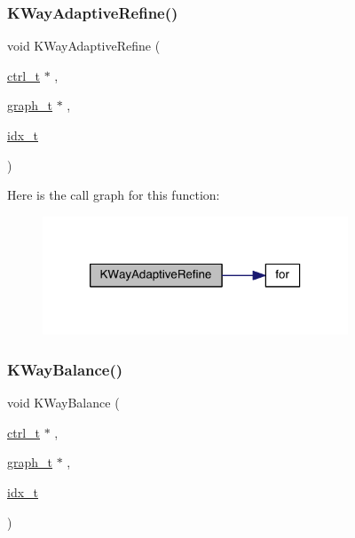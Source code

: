 \subsubsection{\texorpdfstring{K\+Way\+Adaptive\+Refine()}{KWayAdaptiveRefine()}}
{\footnotesize\ttfamily void K\+Way\+Adaptive\+Refine (\begin{DoxyParamCaption}\item[{\hyperlink{a00742}{ctrl\+\_\+t} $\ast$}]{,  }\item[{\hyperlink{a00734}{graph\+\_\+t} $\ast$}]{,  }\item[{\hyperlink{a00876_aaa5262be3e700770163401acb0150f52}{idx\+\_\+t}}]{ }\end{DoxyParamCaption})}

Here is the call graph for this function\+:\nopagebreak
\begin{figure}[H]
\begin{center}
\leavevmode
\includegraphics[width=258pt]{a00951_ad96acf60ec61cb61c4b25fe4d7cb6364_cgraph}
\end{center}
\end{figure}
\mbox{\label{a00951_aa1854c6e5d38950ac52237275f55ca2f}} 
\subsubsection{\texorpdfstring{K\+Way\+Balance()}{KWayBalance()}}
{\footnotesize\ttfamily void K\+Way\+Balance (\begin{DoxyParamCaption}\item[{\hyperlink{a00742}{ctrl\+\_\+t} $\ast$}]{,  }\item[{\hyperlink{a00734}{graph\+\_\+t} $\ast$}]{,  }\item[{\hyperlink{a00876_aaa5262be3e700770163401acb0150f52}{idx\+\_\+t}}]{ }\end{DoxyParamCaption})}


